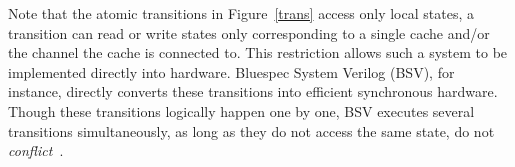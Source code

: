 Note that the atomic transitions in Figure~\ref{trans} access only local states,
\ie{} a transition can read or write states only corresponding to a single cache
and/or the channel the cache is connected to. This restriction allows such a
system to be implemented directly into hardware. Bluespec System Verilog (BSV),
for instance, directly converts these transitions into efficient synchronous
hardware. Though these transitions logically happen one by one, BSV executes
several transitions simultaneously, as long as they do not access the same
state, \ie{} do not \emph{conflict}~\cite{Hoe:TCAD,HoeArvind:TRSSynthesis1}.
